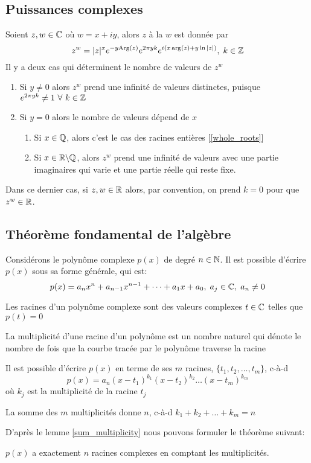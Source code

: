 \subsection{Puissances complexes}
Soient $z, w \in \mathbb{C}$ où $w = x + iy$, alors $z$ à la $w$ est donnée par
\[
    z^w = |z|^{x} e^{-y\text{Arg}(z)} e^{2\pi yk} e^{ i \left(x\arg(z) + y\ln|z|\right) }, \; k \in \mathbb{Z} 
\]
Il y a deux cas qui déterminent le nombre de valeurs de $z^w$
\begin{enumerate}
    \item Si $y \neq 0$ alors $z^w$ prend une infinité de valeurs distinctes, puisque $e^{2\pi yk} \neq 1 \ \forall \ k \in \mathbb{Z}$
    \item Si $y = 0$ alors le nombre de valeurs dépend de $x$ 
    \begin{enumerate}
        \item Si $x \in \mathbb{Q}$, alors c'est le cas des racines entières [\ref{whole_roots}]
        \item Si $x \in \mathbb{R} \backslash \mathbb{Q}$, alors $z^w$ prend une infinité de valeurs avec une partie imaginaires qui varie et une partie réelle qui reste fixe. 
    \end{enumerate}
\end{enumerate}
\begin{remark}
    Dans ce dernier cas, si $z, w \in \mathbb{R}$ alors, par convention, on prend $k = 0$ pour que $z^w \in \mathbb{R}$.
\end{remark}

\subsection{Théorème fondamental de l'algèbre}
Considérons le polynôme complexe $p(x)$ de degré $n \in \mathbb{N}$. Il est possible d'écrire $p(x)$ sous sa forme générale, qui est:
\[
p(x) = a_n x^n + a_{n-1} x^{n-1} + \dots + a_1 x + a_0, \; a_j \in \mathbb{C}, \; a_n \neq 0
\]
\begin{definition}
Les racines d'un polynôme complexe sont des valeurs complexes $t \in \mathbb{C}$ telles que $p(t) = 0$    
\end{definition} 
\begin{definition} %
    La multiplicité d'une racine d'un polynôme est un nombre naturel qui dénote le nombre de fois que la courbe tracée par le polynôme traverse la racine
\end{definition}
\begin{lemma}
    Il est possible d'écrire $p(x)$ en terme de ses $m$ racines, $\{t_1, t_2, \dots ,t_m\}$, c-à-d
\[ p(x) = a_n(x - t_1)^{k_1} (x - t_2)^{k_2} \dots (x - t_m)^{k_m} \]
où $k_j$ est la multiplicité de la racine $t_j$
\end{lemma}
\begin{lemma}
    \label{sum_multiplicity}
    La somme des $m$ multiplicités donne $n$, c-à-d $k_1 + k_2 + \dots + k_m = n$
\end{lemma}
D'après le lemme \ref{sum_multiplicity} nous pouvons formuler le théorème suivant:
\begin{theorem}
    \label{theorem_fondamental_algebra}
    $p(x)$ a exactement $n$ racines complexes en comptant les multiplicités.
\end{theorem}